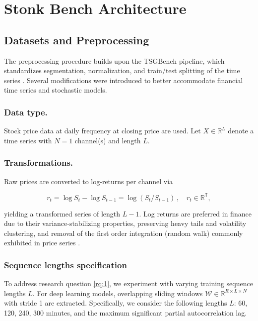 \section{Stonk Bench Architecture}
  \subsection{Datasets and Preprocessing}
    The preprocessing procedure builds upon the TSGBench pipeline, 
    which standardizes segmentation, normalization, and train/test 
    splitting of the time series \cite{Ang23}. Several
    modifications were introduced to better accommodate financial
    time series and stochastic models.

    \subsubsection{Data type.} Stock price data at 
      daily frequency at closing price are 
      used. Let \(X \in \mathbb{R}^{L}\) denote a 
      time series with \(N=1\) channel(s) and length 
      \(L\).

    \subsubsection{Transformations.}\label{sec:transformations}
      Raw prices are converted to log-returns per channel via

      \[ r_t = \log S_t - \log S_{t-1} = \log(S_t / S_{t-1}) \,, 
      \quad r_t \in \mathbb{R^T}, \]
      
      yielding a transformed series of length \(L-1\). Log returns 
      are preferred in finance due to their variance-stabilizing 
      properties, preserving heavy tails and volatility clustering,
      and removal of the first order integration (random walk) 
      commonly exhibited in price series \cite{Takahashi24}.

    \subsubsection{Sequence lengths specification}\label{sec:sequence_length}
      To address research question \ref{rq:1}, we 
        experiment with varying training sequence lengths \(L\).
        For deep learning models, overlapping sliding windows 
        \(\mathcal{W} \in \mathbb{R}^{R \times L \times N}\) with 
        stride 1 are extracted.
        Specifically, we consider the following lengths \( L \):
        60, 120, 240, 300 minutes, and the maximum significant 
        partial autocorrelation lag.
      
